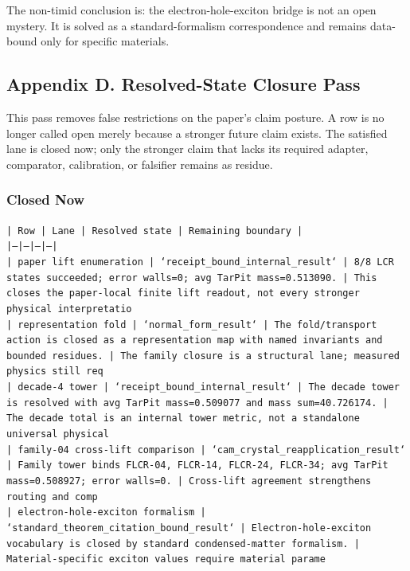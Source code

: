 \documentclass[11pt]{article}
\begin{document}
The non-timid conclusion is: the electron-hole-exciton bridge is not an open mystery. It is solved as a standard-formalism correspondence and remains data-bound only for specific materials.

\subsection*{Appendix D. Resolved-State Closure Pass}

This pass removes false restrictions on the paper's claim posture. A row is no longer called open merely because a stronger future claim exists. The satisfied lane is closed now; only the stronger claim that lacks its required adapter, comparator, calibration, or falsifier remains as residue.

\subsubsection*{Closed Now}

\noindent\texttt{| Row | Lane | Resolved state | Remaining boundary |}\\
\noindent\texttt{|---|---|---|---|}\\
\noindent\texttt{| paper lift enumeration | `receipt\_bound\_internal\_result` | 8/8 LCR states succeeded; error walls=0; avg TarPit mass=0.513090. | This closes the paper-local finite lift readout, not every stronger physical interpretatio}\\
\noindent\texttt{| representation fold | `normal\_form\_result` | The fold/transport action is closed as a representation map with named invariants and bounded residues. | The family closure is a structural lane; measured physics still req}\\
\noindent\texttt{| decade-4 tower | `receipt\_bound\_internal\_result` | The decade tower is resolved with avg TarPit mass=0.509077 and mass sum=40.726174. | The decade total is an internal tower metric, not a standalone universal physical }\\
\noindent\texttt{| family-04 cross-lift comparison | `cam\_crystal\_reapplication\_result` | Family tower binds FLCR-04, FLCR-14, FLCR-24, FLCR-34; avg TarPit mass=0.508927; error walls=0. | Cross-lift agreement strengthens routing and comp}\\
\noindent\texttt{| electron-hole-exciton formalism | `standard\_theorem\_citation\_bound\_result` | Electron-hole-exciton vocabulary is closed by standard condensed-matter formalism. | Material-specific exciton values require material parame}\\
\end{document}
